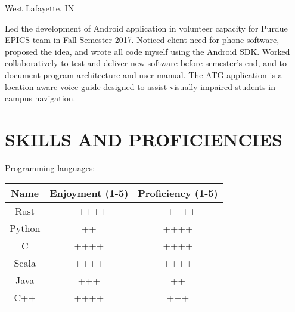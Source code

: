 \documentclass[10pt]{res}
\begin{document}
\begin{resume}
\begin{tabbing}
                             \>West Lafayette, IN
   \end{tabbing}\vspace{-20pt}      %
	Led the development of Android application in volunteer capacity for Purdue EPICS team in Fall Semester 2017. Noticed client need for phone software, proposed the idea, and wrote all code myself
	using the Android SDK. Worked collaboratively to test and deliver new software before semester's end, and to document program architecture and user manual. The ATG
	application is a location-aware voice guide designed to assist visually-impaired students in campus navigation.
\begin{comment}
	\vspace{-10pt}\begin{tabbing}
   \hspace{2.3in}\= \hspace{2.6in}\= \kill %
    {\bf Assistant} \>Mid-America Homes \>Summers 2016 - 2017 \\
                             \>Noblesville, IN
   \end{tabbing}\vspace{-20pt}      %
	Worked as assistant to owner of construction/remodeling business. 
	Cleared wreckage, removed damaged furniture and appliances, repaired electrical wiring, replaced plumbing. 
	Managed a small number of sub-contractors and prepared materials invoices and shipment orders. 
\end{comment}
\vspace{-10pt}\section{SKILLS AND PROFICIENCIES}          
  Programming languages:\\
  \begin{tabular}{c | c | c}
    \hline
    Name & Enjoyment (1-5) & Proficiency (1-5) \\\hline
    Rust & +++++ & +++++ \\
    Python & ++ & ++++ \\
    C & ++++ & ++++ \\
    Scala & ++++ & ++++ \\
    Java & +++ & ++ \\
    C++ & ++++ & +++ \\
    \hline
  \end{tabular}\\

\end{resume}
\end{document}
